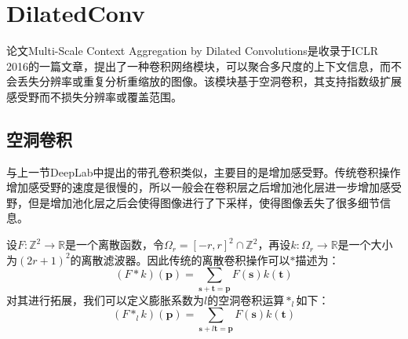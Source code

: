 \documentclass[cn]{elegantbook}
\begin{document}
\section{DilatedConv}
论文Multi-Scale Context Aggregation by Dilated Convolutions\cite{yu2015multi}是收录于ICLR 2016的一篇文章，提出了一种卷积网络模块，可以聚合多尺度的上下文信息，而不会丢失分辨率或重复分析重缩放的图像。该模块基于空洞卷积，其支持指数级扩展感受野而不损失分辨率或覆盖范围。

\subsection{空洞卷积}
与上一节DeepLab中提出的带孔卷积类似，主要目的是增加感受野。传统卷积操作增加感受野的速度是很慢的，所以一般会在卷积层之后增加池化层进一步增加感受野，但是增加池化层之后会使得图像进行了下采样，使得图像丢失了很多细节信息。

设$F:\mathbb{Z}^2\to \mathbb{R}$是一个离散函数，令$\Omega_r=[-r,r]^2\cap \mathbb{Z}^2$，再设$k:\Omega_r\to \mathbb{R}$是一个大小为$(2r+1)^2$的离散滤波器。因此传统的离散卷积操作可以$*$描述为：
\begin{equation}
(F*k)(\mathbf{p})=\sum_{\mathbf{s}+\mathbf{t}=\mathbf{p}}F(\mathbf{s})k(\mathbf{t})
\end{equation}
对其进行拓展，我们可以定义膨胀系数为$l$的空洞卷积运算$*_l$如下：
\begin{equation}
(F*_lk)(\mathbf{p})=\sum_{\mathbf{s}+l\mathbf{t}=\mathbf{p}}F(\mathbf{s})k(\mathbf{t})
\end{equation}
\end{document}
